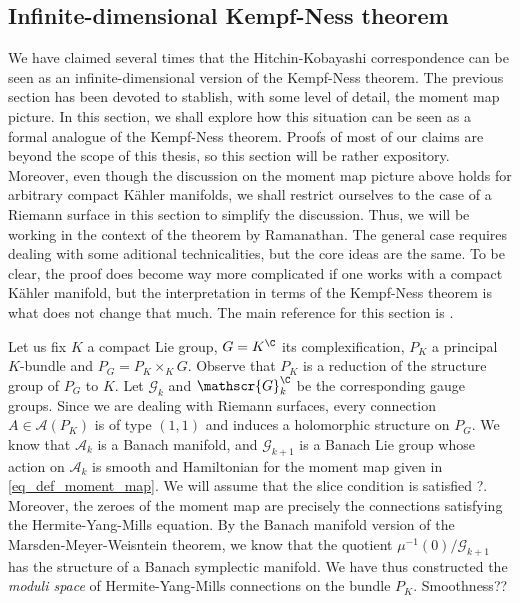 {\subsection{Infinite-dimensional Kempf-Ness theorem}
We have claimed several times that the Hitchin-Kobayashi correspondence can be seen as an infinite-dimensional version of the Kempf-Ness theorem. The previous section has been devoted to stablish, with some level of detail, the moment map picture. In this section, we shall explore how this situation can be seen as a formal analogue of the Kempf-Ness theorem. Proofs of most of our claims are beyond the scope of this thesis, so this section will be rather expository. Moreover, even though the discussion on the moment map picture above holds for arbitrary compact Kähler manifolds, we shall restrict ourselves to the case of a Riemann surface in this section to simplify the discussion. Thus, we will be working in the context of the theorem by Ramanathan. The general case requires dealing with some aditional technicalities, but the core ideas are the same. To be clear, the proof does become way more complicated if one works with a compact Kähler manifold, but the interpretation in terms of the Kempf-Ness theorem is what does not change that much. The main reference for this section is \parencite{trautwein2015surveygitpictureyangmills}. \newline\newline

Let us fix \(K\) a compact Lie group, \(G=K^\C\) its complexification, \(P_K\) a principal \(K\)-bundle and \(P_G=P_K \times_K G\). Observe that \(P_K\) is a reduction of the structure group of \(P_G\) to \(K\). Let \(\mathscr{G}_k\) and \(\mathscr{G}_k^\C\) be the corresponding gauge groups. Since we are dealing with Riemann surfaces, every connection \(A\in \mathscr{A}(P_K)\) is of type \((1,1)\) and induces a holomorphic structure on \(P_G\). We know that \(\mathscr{A}_k\) is a Banach manifold, and \(\mathscr{G}_{k+1}\) is a Banach Lie group whose action on \(\mathscr{A}_k\) is smooth and Hamiltonian for the moment map given in \eqref{eq_def_moment_map}. We will assume that the slice condition is satisfied {\color{red}?}. Moreover, the zeroes of the moment map are precisely the connections satisfying the Hermite-Yang-Mills equation. By the Banach manifold version of the Marsden-Meyer-Weisntein theorem, we know that the quotient \(\mu^{-1}(0)/\mathscr{G}_{k+1}\) has the structure of a Banach symplectic manifold. We have thus constructed the \textit{moduli space} of Hermite-Yang-Mills connections on the bundle \(P_K\). {\color{red} Smoothness??} \newline \newline

}

